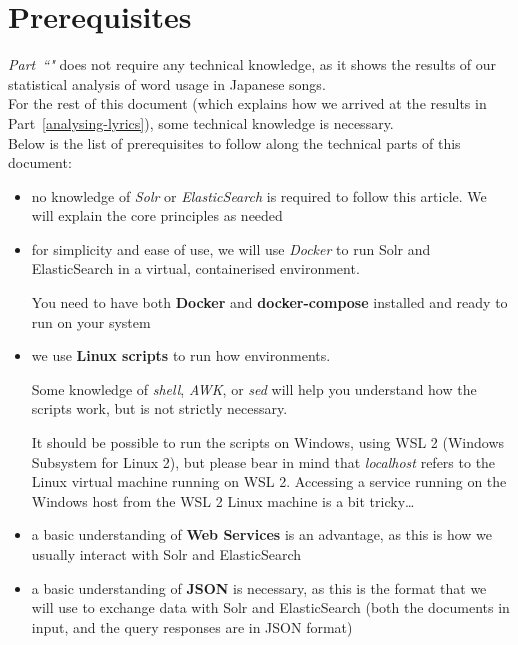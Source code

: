\bigskip

\newpage

\section{Prerequisites}

\emph{Part~``"} does not require any technical knowledge, as it shows the results of our statistical analysis of word usage in Japanese songs. \\

For the rest of this document (which explains how we arrived at the results in Part~\ref{analysing-lyrics}), some technical knowledge is necessary. \\

Below is the list of prerequisites to follow along the technical parts of this document:


\begin{itemize}
	\item no knowledge of \emph{Solr} or \emph{ElasticSearch} is required to follow this article. We will explain the core principles as needed
	
	\item for simplicity and ease of use, we will use \emph{Docker} to run Solr and ElasticSearch in a virtual, containerised environment.
	
	You need to have both \textbf{Docker} and \textbf{docker-compose} installed and ready to run on your system
	
	\item we use \textbf{Linux scripts} to run how environments. 
	
	Some knowledge of \emph{shell}, \emph{AWK}, or \emph{sed} will help you understand how the scripts work, but is not strictly necessary.
	
	It should be possible to run the scripts on Windows, using WSL 2 (Windows Subsystem for Linux 2), but please bear in mind that \emph{localhost} refers to the Linux virtual machine running on WSL 2. Accessing a service running on the Windows host from the WSL 2 Linux machine is a bit tricky\dots
	
	\item a basic understanding of \textbf{Web Services} is an advantage, as this is how we usually interact with Solr and ElasticSearch
	
	\item a basic understanding of \textbf{JSON} is necessary, as this is the format that we will use to exchange data with Solr and ElasticSearch (both the documents in input, and the query responses are in JSON format)
\end{itemize}



